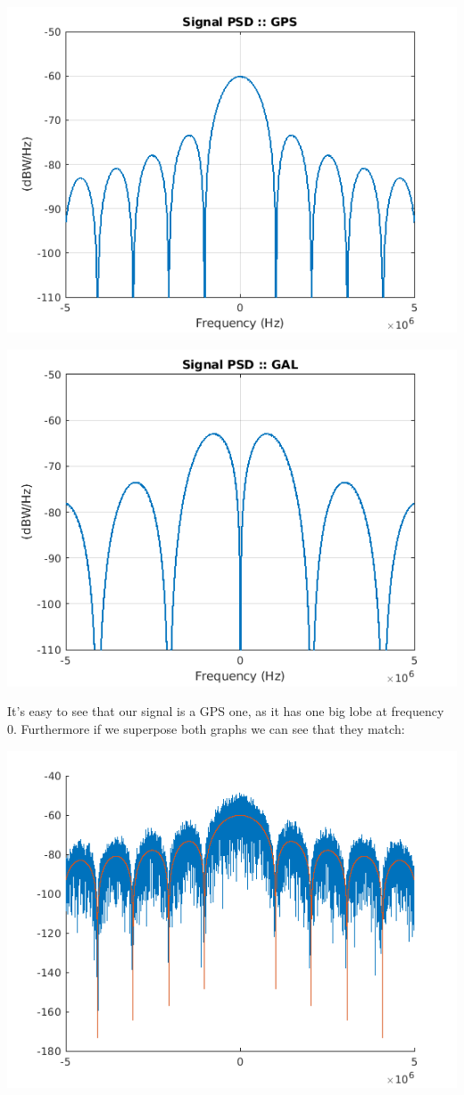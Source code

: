 \documentclass[conference,9pt]{IEEEtran}
\begin{document}
\includegraphics[scale=0.6]{gps}

\includegraphics[scale=0.6]{gal}

It's easy to see that our signal is a GPS one, as it has one big lobe at frequency 0. Furthermore if we superpose both graphs we can see that they match:

\includegraphics[scale=0.6]{compare}
\end{document}

